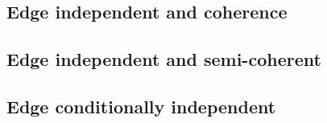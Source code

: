 \documentclass{article}
\begin{document}


\subsection{Edge independent and coherence} %
\label{sub:edge_independent_and_coherence}



\subsection{Edge independent and semi-coherent} %
\label{sub:edge_independent_and_semi_coherent}


\subsection{Edge conditionally independent} %
\label{sub:edge_cond}
\end{document}
